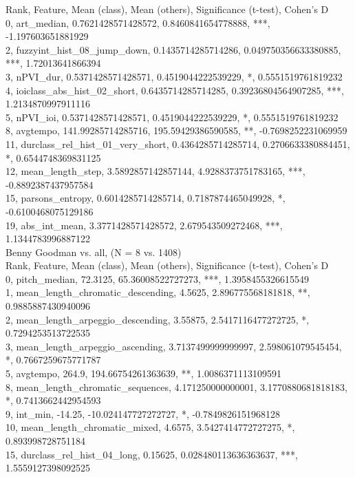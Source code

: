 Rank, Feature, Mean (class), Mean (others), Significance (t-test), Cohen's D\\
0, art_median, 0.7621428571428572, 0.8460841654778888, ***, -1.197603651881929\\
2, fuzzyint_hist_08_jump_down, 0.1435714285714286, 0.049750356633380885, ***, 1.72013641866394\\
3, nPVI_dur, 0.5371428571428571, 0.4519044222539229, *, 0.5551519761819232\\
4, ioiclass_abs_hist_02_short, 0.6435714285714285, 0.39236804564907285, ***, 1.2134870997911116\\
5, nPVI_ioi, 0.5371428571428571, 0.4519044222539229, *, 0.5551519761819232\\
8, avgtempo, 141.99285714285716, 195.59429386590585, **, -0.7698252231069959\\
11, durclass_rel_hist_01_very_short, 0.4364285714285714, 0.2706633380884451, *, 0.6544748369831125\\
12, mean_length_step, 3.5892857142857144, 4.9288373751783165, ***, -0.8892387437957584\\
15, parsons_entropy, 0.6014285714285714, 0.7187874465049928, *, -0.6100468075129186\\
19, abs_int_mean, 3.3771428571428572, 2.679543509272468, ***, 1.1344783996887122\\
Benny Goodman vs. all, (N = 8 vs. 1408)\\
Rank, Feature, Mean (class), Mean (others), Significance (t-test), Cohen's D\\
0, pitch_median, 72.3125, 65.36008522727273, ***, 1.3958455326615549\\
1, mean_length_chromatic_descending, 4.5625, 2.896775568181818, **, 0.9885887430940096\\
2, mean_length_arpeggio_descending, 3.55875, 2.5417116477272725, *, 0.7294253513722535\\
3, mean_length_arpeggio_ascending, 3.7137499999999997, 2.598061079545454, *, 0.7667259675771787\\
5, avgtempo, 264.9, 194.66754261363639, **, 1.0086371113109591\\
8, mean_length_chromatic_sequences, 4.171250000000001, 3.1770880681818183, *, 0.7413662442954593\\
9, int_min, -14.25, -10.024147727272727, *, -0.7849826151968128\\
10, mean_length_chromatic_mixed, 4.6575, 3.5427414772727275, *, 0.893998728751184\\
15, durclass_rel_hist_04_long, 0.15625, 0.028480113636363637, ***, 1.5559127398092525\\
